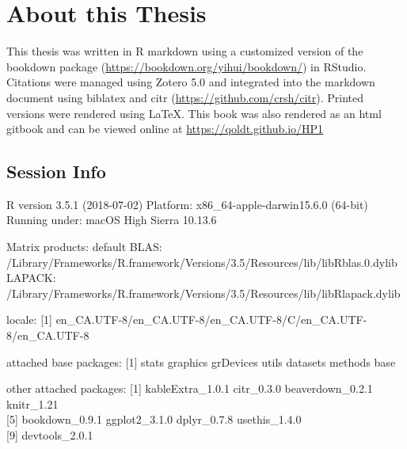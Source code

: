 \documentclass[onehalf,12pt]{beavtex}
\begin{document}
  \section{About this Thesis}\label{about-this-thesis}
  
  This thesis was written in R markdown using a customized version of the
  bookdown package (\url{https://bookdown.org/yihui/bookdown/}) in
  RStudio. Citations were managed using Zotero 5.0 and integrated into the
  markdown document using biblatex and citr
  (\url{https://github.com/crsh/citr}). Printed versions were rendered
  using LaTeX. This book was also rendered as an html gitbook and can be
  viewed online at \url{https://qoldt.github.io/HP1}
  
  \subsection*{Session Info}\label{session-info}
  
  \begin{Shaded}
  \begin{Highlighting}[]
  \NormalTok{()}
  \end{Highlighting}
  \end{Shaded}
  
  R version 3.5.1 (2018-07-02) Platform: x86\_64-apple-darwin15.6.0
  (64-bit) Running under: macOS High Sierra 10.13.6
  
  Matrix products: default BLAS:
  /Library/Frameworks/R.framework/Versions/3.5/Resources/lib/libRblas.0.dylib
  LAPACK:
  /Library/Frameworks/R.framework/Versions/3.5/Resources/lib/libRlapack.dylib
  
  locale: {[}1{]}
  en\_CA.UTF-8/en\_CA.UTF-8/en\_CA.UTF-8/C/en\_CA.UTF-8/en\_CA.UTF-8
  
  attached base packages: {[}1{]} stats graphics grDevices utils datasets
  methods base
  
  other attached packages: {[}1{]} kableExtra\_1.0.1 citr\_0.3.0
  beaverdown\_0.2.1 knitr\_1.21\\
  {[}5{]} bookdown\_0.9.1 ggplot2\_3.1.0 dplyr\_0.7.8 usethis\_1.4.0\\
  {[}9{]} devtools\_2.0.1
  
\end{document}
